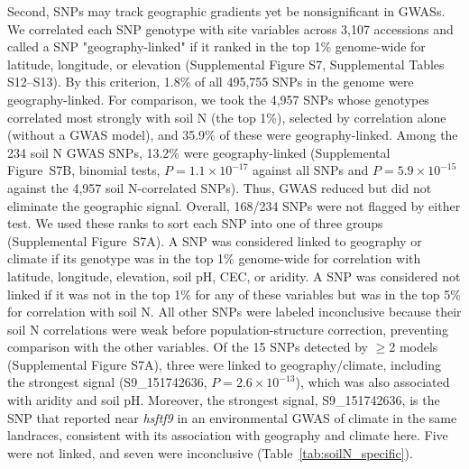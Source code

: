 \documentclass[namedate,unnumsec,webpdf,contemporary,large]{oup-authoring-template}
\begin{document}
Second, SNPs may track geographic gradients yet be nonsignificant in GWASs. We correlated each SNP genotype with site variables across 3,107 accessions and called a SNP "geography-linked" if it ranked in the top 1\% genome-wide for latitude, longitude, or elevation (Supplemental Figure S7, Supplemental Tables S12--S13). By this criterion, 1.8\% of all 495,755 SNPs in the genome were geography-linked. For comparison, we took the 4,957 SNPs whose genotypes correlated most strongly with soil N (the top 1\%), selected by correlation alone (without a GWAS model), and 35.9\% of these were geography-linked. Among the 234 soil N GWAS SNPs, 13.2\% were geography-linked (Supplemental Figure~S7B, binomial tests, $P = 1.1 \times 10^{-17}$ against all SNPs and $P = 5.9 \times 10^{-15}$ against the 4,957 soil N-correlated SNPs). Thus, GWAS reduced but did not eliminate the geographic signal. Overall, 168/234 SNPs were not flagged by either test. We used these ranks to sort each SNP into one of three groups (Supplemental Figure~S7A). A SNP was considered linked to geography or climate if its genotype was in the top 1\% genome-wide for correlation with latitude, longitude, elevation, soil pH, CEC, or aridity. A SNP was considered not linked if it was not in the top 1\% for any of these variables but was in the top 5\% for correlation with soil N. All other SNPs were labeled inconclusive because their soil N correlations were weak before population-structure correction, preventing comparison with the other variables. Of the 15 SNPs detected by $\geq$2 models (Supplemental Figure S7A), three were linked to geography/climate, including the strongest signal (S9\_151742636, $P = 2.6 \times 10^{-13}$), which was also associated with aridity and soil pH. Moreover, the strongest signal, S9\_151742636, is the SNP that \citet{Li2025ClimateEnvGWAS} reported near \textit{hsftf9} in an environmental GWAS of climate in the same landraces, consistent with its association with geography and climate here. Five were not linked, and seven were inconclusive (Table~\ref{tab:soilN_specific}).
\end{document}
